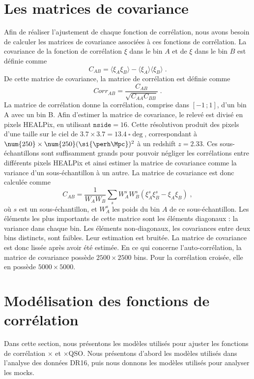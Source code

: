 \section{Les matrices de covariance}
\label{sec:calcul_cov}
Afin de réaliser l'ajustement de chaque fonction de corrélation, nous avons besoin de calculer les matrices de covariance associées à ces fonctions de corrélation. La covariance de la fonction de corrélation $\xi$ dans le bin $A$ et de $\xi$ dans le bin $B$ est définie comme
\begin{equation}
  C_{AB} = \langle \xi_A \xi_B \rangle - \langle \xi_A \rangle \langle \xi_B \rangle \; .
\end{equation}
De cette matrice de covariance, la matrice de corrélation est définie comme
\begin{equation}
  Corr_{AB} = \frac{C_{AB}}{\sqrt{C_{AA} C_{BB}}} \; .
\end{equation}
La matrice de corrélation donne la corrélation, comprise dans $[-1 \, ; 1]$, d'un bin A avec un bin B.
Afin d'estimer la matrice de covariance, le relevé est divisé en pixels HEALPix, en utilisant $\texttt{nside} = \num{16}$. Cette résolutivon produit des pixels d'une taille sur le ciel de $\num{3.7} \times \num{3.7} = \SI{13.4}{\square\deg}$, correspondant à $\num{250} \times \num{250} (\si{\perh\Mpc})^2$ à un redshift $z = \num{2.33}$. Ces sous-échantillons sont suffisamment grands pour pouvoir négliger les corrélations entre différents pixels HEALPix et ainsi estimer la matrice de covariance comme la variance d'un sous-échantillon à un autre. La matrice de covariance est donc calculée comme
\begin{equation}
  C_{AB} = \frac{1}{W_A W_B} \sum_s W_A^s W_B^s \left( \xi_A^s \xi_B^s - \xi_A \xi_B \right) \; ,
\end{equation}
où $s$ est un sous-échantillon, et $W_A^s$ les poids du bin $A$ de ce sous-échantillon.
Les éléments les plus importants de cette matrice sont les éléments diagonaux : la variance dans chaque bin. Les éléments non-diagonaux, les covariances entre deux bins distincts, sont faibles. Leur estimation est bruitée. La matrice de covariance est donc lissée après avoir été estimée.
En ce qui concerne l'auto-corrélation, la matrice de covariance possède $\num{2500} \times \num{2500}$ bins. Pour la corrélation croisée, elle en possède $\num{5000} \times \num{5000}$.



\section{Modélisation des fonctions de corrélation}
Dans cette section, nous présentons les modèles utilisés pour ajuster les fonctions de corrélation \lya{}$\times$\lya{} et \lya{}$\times$QSO. Nous présentons d'abord les modèles utilisés dans l'analyse des données DR16, puis nous donnons les modèles utilisés pour analyser les mocks.

